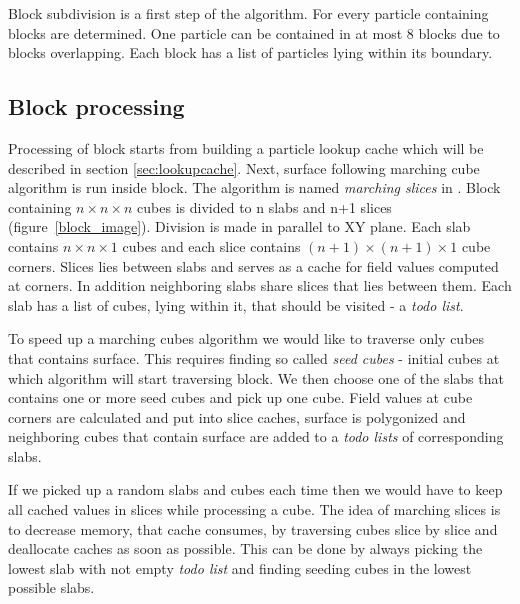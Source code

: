 
Block subdivision is a first step of the algorithm. For every particle containing blocks are determined. One particle can be contained in at most 8 blocks due to blocks overlapping. Each block has a list of particles lying within its boundary. 

\subsection{Block processing} \label{sec:block_processing}
Processing of block starts from building a particle lookup cache which will be described in section \ref{sec:lookupcache}. Next, surface following marching cube algorithm is run inside block. The algorithm is named \textit{marching slices} in \cite{RosenbergBirdwell2008}. Block containing $n \times n \times n$ cubes is divided to n slabs and n+1 slices (figure~\ref{block_image}). Division is made in parallel to XY plane. Each slab contains $n \times n \times 1$ cubes and each slice contains $(n+1) \times (n+1) \times 1$ cube corners. Slices lies between slabs and serves as a cache for field values computed at corners. In addition neighboring slabs share slices that lies between them. Each slab has a list of cubes, lying within it, that should be visited - a \textit{todo list}.


To speed up a marching cubes algorithm we would like to traverse only cubes that contains surface. This requires finding so called \textit{seed cubes} - initial cubes at which algorithm will start traversing block. We then choose one of the slabs that contains one or more seed cubes and pick up one cube. Field values at cube corners are calculated and put into slice caches, surface is polygonized and neighboring cubes that contain surface are added to a \textit{todo lists} of corresponding slabs. 

If we picked up a random slabs and cubes each time then we would have to keep all cached values in slices while processing a cube. The idea of marching slices is to decrease memory, that cache consumes, by traversing cubes slice by slice and deallocate caches as soon as possible. This can be done by always picking the lowest slab with not empty \textit{todo list} and finding seeding cubes in the lowest possible slabs. 

